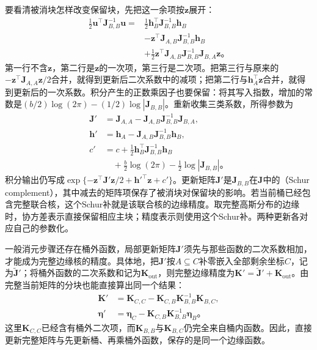 要看清被消块怎样改变保留块，先把这一余项按$\bm{z}$展开：
\[
  \begin{aligned}
    \frac12\bm{u}^{\top}\bm{J}_{B,B}^{-1}\bm{u}
    ={}&\frac12\bm{h}_B^{\top}\bm{J}_{B,B}^{-1}\bm{h}_B\\
       &-\bm{z}^{\top}\bm{J}_{A,B}\bm{J}_{B,B}^{-1}\bm{h}_B\\
       &+\frac12\bm{z}^{\top}\bm{J}_{A,B}
          \bm{J}_{B,B}^{-1}\bm{J}_{B,A}\bm{z}
          \text{。}
  \end{aligned}
\]
第一行不含$\bm{z}$，第二行是$\bm{z}$的一次项，第三行是二次项。把第三行与原来的$-\bm{z}^{\top}\bm{J}_{A,A}\bm{z}/2$合并，就得到更新后二次系数中的减项；把第二行与$\bm{h}_A^{\top}\bm{z}$合并，就得到更新后的一次系数。积分产生的正数乘因子也要保留：将其写入指数，增加的常数是$(b/2)\log(2\pi)-(1/2)\log|\bm{J}_{B,B}|$。重新收集三类系数，所得参数为
\begin{equation}
  \begin{aligned}
    \bm{J}'&=\bm{J}_{A,A}
      -\bm{J}_{A,B}\bm{J}_{B,B}^{-1}\bm{J}_{B,A},\\
    \bm{h}'&=\bm{h}_A
      -\bm{J}_{A,B}\bm{J}_{B,B}^{-1}\bm{h}_B,\\
    c'&=c+\frac12\bm{h}_B^{\top}\bm{J}_{B,B}^{-1}\bm{h}_B\\
      &\quad+\frac b2\log(2\pi)-\frac12\log|\bm{J}_{B,B}|
      \text{。}
  \end{aligned}
  \label{eq:pgm-elimination-schur}
\end{equation}
积分输出仍写成$\exp\{-\bm{z}^{\top}\bm{J}'\bm{z}/2+\bm{h}'^{\top}\bm{z}+c'\}$。更新矩阵$\bm{J}'$是$\bm{J}_{B,B}$在$\bm{J}$中的（Schur complement），其中减去的矩阵项保存了被消块对保留块的影响。若当前桶已经包含完整联合核，这个Schur补就是该联合核的边缘精度。取完整高斯分布的边缘时，协方差表示直接保留相应主块；精度表示则使用这个Schur补。两种更新各对应自己的参数化。

一般消元步骤还存在桶外函数，局部更新矩阵$\bm{J}'$须先与那些函数的二次系数相加，才能成为完整边缘核的精度。具体地，把$\bm{J}'$按$A\subseteq C$补零嵌入全部剩余坐标$C$，记为$\widetilde{\bm{J}}'$；将桶外函数的二次系数和记为$\bm{K}_{\mathrm{out}}$，则完整边缘精度为$\bm{K}'=\widetilde{\bm{J}}'+\bm{K}_{\mathrm{out}}$。由完整当前矩阵的分块也能直接算出同一个结果：
\[
  \begin{aligned}
    \bm{K}'&=\bm{K}_{C,C}
       -\bm{K}_{C,B}\bm{K}_{B,B}^{-1}\bm{K}_{B,C},\\
    \bm{\eta}'&=\bm{\eta}_C
       -\bm{K}_{C,B}\bm{K}_{B,B}^{-1}\bm{\eta}_B
       \text{。}
  \end{aligned}
\]
这里$\bm{K}_{C,C}$已经含有桶外二次项，而$\bm{K}_{B,B}$与$\bm{K}_{B,C}$仍完全来自桶内函数。因此，直接更新完整矩阵与先更新桶、再乘桶外函数，保存的是同一个边缘函数。


